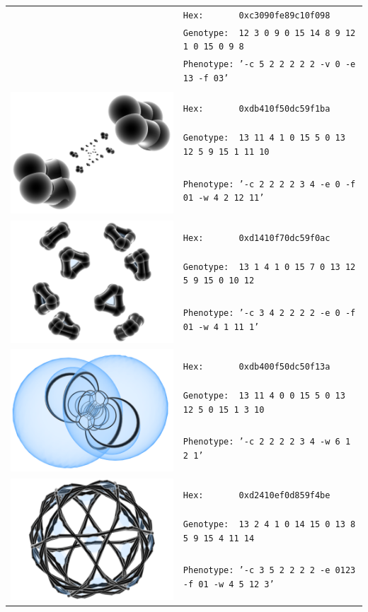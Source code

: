 \documentclass{article}
\begin{document}
\begin{center}
\begin{table}[h!!t]
\begin{tabular}{|l|l|}
		& \texttt{Hex:\ \ \ \ \ \ \ 0xc3090fe89c10f098}\\
		& \texttt{Genotype:\ \ 12 3 0 9 0 15 14 8 9 12 1 0 15 0 9 8}\\
		& \texttt{Phenotype:\ '-c 5 2 2 2 2 2 -v 0 -e 13 -f 03'}\\
		& \\
		\hline
		\multirow{5}{*}{\includegraphics[width = .12\textwidth]{../Examples/0xdb410f50dc59f1ba.png}}
		& \\
		& \texttt{Hex:\ \ \ \ \ \ \ 0xdb410f50dc59f1ba}\\
		& \texttt{Genotype:\ \ 13 11 4 1 0 15 5 0 13 12 5 9 15 1 11 10}\\
		& \texttt{Phenotype:\ '-c 2 2 2 2 3 4  -e 0 -f 01 -w 4 2 12 11'}\\
		& \\
		\hline
		\multirow{5}{*}{\includegraphics[width = .12\textwidth]{../Examples/0xd1410f70dc59f0ac.png}}
		& \\
		& \texttt{Hex:\ \ \ \ \ \ \ 0xd1410f70dc59f0ac}\\
		& \texttt{Genotype:\ \ 13 1 4 1 0 15 7 0 13 12 5 9 15 0 10 12}\\
		& \texttt{Phenotype:\ '-c 3 4 2 2 2 2  -e 0 -f 01 -w 4 1 11 1'}\\
		& \\
		\hline
		\multirow{5}{*}{\includegraphics[width = .12\textwidth]{../Examples/0xdb400f50dc50f13a.png}}
		& \\
		& \texttt{Hex:\ \ \ \ \ \ \ 0xdb400f50dc50f13a}\\
		& \texttt{Genotype:\ \ 13 11 4 0 0 15 5 0 13 12 5 0 15 1 3 10}\\
		& \texttt{Phenotype:\ '-c 2 2 2 2 3 4 -w 6 1 2 1'}\\
		& \\
		\hline
		\multirow{5}{*}{\includegraphics[width = .12\textwidth]{../Examples/0xd2410ef0d859f4be.png}}
		& \\
		& \texttt{Hex:\ \ \ \ \ \ \ 0xd2410ef0d859f4be}\\
		& \texttt{Genotype:\ \ 13 2 4 1 0 14 15 0 13 8 5 9 15 4 11 14}\\
		& \texttt{Phenotype:\ '-c 3 5 2 2 2 2  -e 0123 -f 01 -w 4 5 12 3'}\\
		& \\
		\hline
	\end{tabular}
	\label{projparams}
	\end{table}
\end{center}
\end{document}

